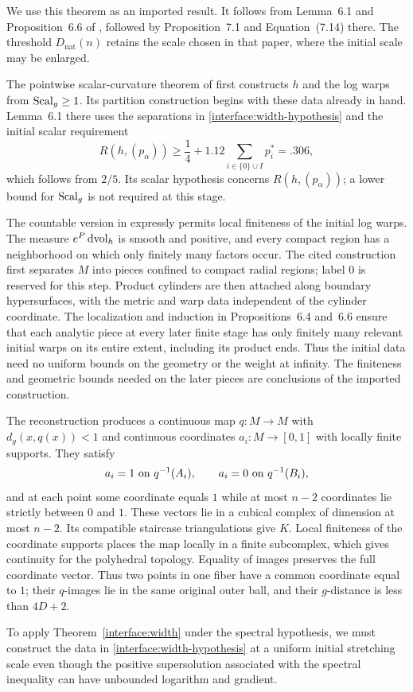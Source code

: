 We use this theorem as an imported result.  It follows from
Lemma~6.1 and Proposition~6.6 of \cite{OpenAIWidth}, followed by
Proposition~7.1 and Equation~(7.14) there.  The threshold
$D_{\mathrm{nat}}(n)$ retains the scale chosen in that paper, where
the initial scale may be enlarged.

The pointwise scalar-curvature theorem of \cite{OpenAIWidth} first
constructs $h$ and the log warps from $\operatorname{Scal}_g\ge1$.  Its partition
construction begins with these data already in hand.  Lemma~6.1 there
uses the separations in \eqref{interface:width-hypothesis} and the
initial scalar requirement
\[
 R(h,(p_\alpha))\ge\frac14+1.12\sum_{i\in\{0\}\cup I}p_i^*
                         =.306,
\]
which follows from $2/5$.  Its scalar hypothesis concerns
$R(h,(p_\alpha))$; a lower bound for $\operatorname{Scal}_g$ is not required at this
stage.

The countable version in \cite{OpenAIWidth} expressly permits local
finiteness of the initial log warps.  The measure
$e^P\,\mathrm d\mathrm{vol}_h$ is smooth and positive, and every compact region
has a neighborhood on which only finitely many factors occur.
The cited construction first separates $M$ into pieces confined to
compact radial regions; label $0$ is reserved for this step.  Product
cylinders are then attached along boundary hypersurfaces, with the
metric and warp data independent of the cylinder coordinate.  The
localization and induction in Propositions~6.4 and~6.6 ensure that each
analytic piece at every later finite stage has only finitely many
relevant initial warps on its entire extent, including its product
ends.  Thus the initial data need no uniform bounds on the geometry
or the weight at infinity.  The finiteness and geometric bounds needed
on the later pieces are conclusions of the imported construction.

The reconstruction produces a continuous map $q:M\to M$ with
$d_g(x,q(x))<1$ and continuous coordinates $a_i:M\to[0,1]$ with locally
finite supports.  They satisfy
\[
 a_i=1\ \hbox{on }q^{-1}(A_i),\qquad
 a_i=0\ \hbox{on }q^{-1}(B_i),
\]
and at each point some coordinate equals $1$ while at most $n-2$
coordinates lie strictly between $0$ and $1$.  These vectors lie in a
cubical complex of dimension at most $n-2$.  Its compatible staircase
triangulations give $K$.  Local finiteness of the coordinate supports
places the map locally in a finite subcomplex, which gives continuity
for the polyhedral topology.  Equality of images preserves the full
coordinate vector.  Thus two points in one fiber have a common
coordinate equal to $1$; their $q$-images lie in the same original
outer ball, and their $g$-distance is less than $4D+2$.

To apply Theorem~\ref{interface:width} under the spectral hypothesis,
we must construct the data in \eqref{interface:width-hypothesis} at a uniform
initial stretching scale even though the positive supersolution
associated with the spectral inequality can have unbounded logarithm and
gradient.
